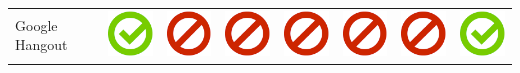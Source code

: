 \documentclass[10pt,foldmark,tumble]{leaflet}
\begin{document}
{{\begin{tabular}{ L{2cm} | C{2cm} | C{2cm} | C{2cm} | C{2cm} | C{2cm} | C{2cm} | C{2cm} | }
Google Hangout & \includegraphics[scale=0.1]{pics/haken.png} & \includegraphics[scale=0.1]{pics/nohaken.png} & \includegraphics[scale=0.1]{pics/nohaken.png} & \includegraphics[scale=0.1]{pics/nohaken.png} & \includegraphics[scale=0.1]{pics/nohaken.png} & \includegraphics[scale=0.1]{pics/nohaken.png} & \includegraphics[scale=0.1]{pics/haken.png} \tabularnewline

\end{tabular}}}
\end{document}
